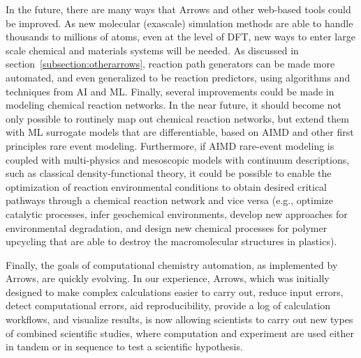 \documentclass[runningheads,a4paper]{llncs}
\begin{document}
In the future, there are many ways that Arrows and other web-based tools could be improved.  As new molecular (exascale) simulation methods are able to handle thousands to millions of atoms, even at the level of DFT, new  ways to enter large scale chemical and materials systems will be needed.  As discussed in section~\ref{subsection:otherarrows}, reaction path generators can be made more automated, and even generalized to be reaction predictors, using algorithms and techniques from AI and ML.  Finally, several improvements could be made in modeling chemical reaction networks.  In the near future, it should become not only possible to routinely map out chemical reaction networks, but extend them with ML surrogate models that are differentiable, based on AIMD and other first principles rare event modeling. Furthermore, if AIMD rare-event modeling is coupled with multi-physics and mesoscopic models with continuum descriptions, such as classical density-functional theory, it could be possible to enable the optimization of reaction environmental conditions to obtain desired critical pathways through a chemical reaction network and vice versa (e.g., optimize catalytic processes, infer geochemical environments, develop new approaches for environmental degradation, and design new chemical processes for polymer upcycling that are able to destroy the macromolecular structures in plastics).


Finally, the goals of computational chemistry automation, as implemented by Arrows, are quickly evolving.  In our experience,  Arrows, which was initially designed to make complex calculations easier to carry out, reduce input errors, detect computational errors, aid reproducibility, provide a log of calculation workflows, and visualize results, is now allowing scientists to carry out new types of combined scientific studies, where computation and experiment are used either in tandem or in sequence to test a scientific hypothesis.







\end{document}
